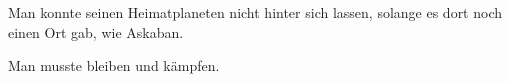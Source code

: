 Man konnte seinen Heimatplaneten nicht hinter sich lassen, solange es dort noch einen Ort gab, wie Askaban.

Man musste bleiben und kämpfen.

